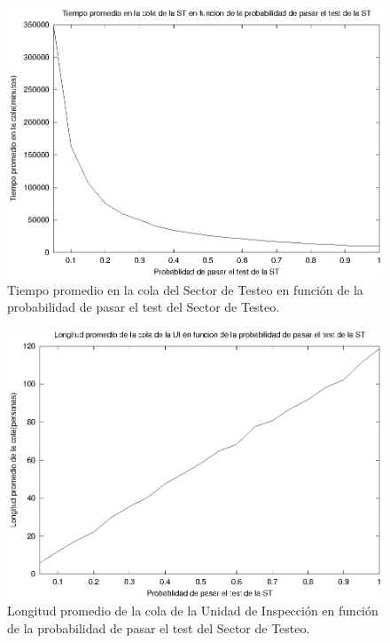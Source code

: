 \documentclass[a4paper,10pt]{article}
\begin{document}
\begin{figure}[ht]
\begin{center}
\includegraphics[width=15cm]{./img/tp_ST.eps}
\caption{\label{fig:tp_ST} Tiempo promedio en la cola del Sector de Testeo en funci\'on de la probabilidad de pasar el test del Sector de Testeo.}
\end{center}
\end{figure}

\begin{figure}[ht]
\begin{center}
\includegraphics[width=15cm]{./img/ql_UI.eps}
\caption{\label{fig:ql_UI} Longitud promedio de la cola de la Unidad de Inspecci\'on en funci\'on de la probabilidad de pasar el test del Sector de Testeo.}
\end{center}
\end{figure}
\end{document}
